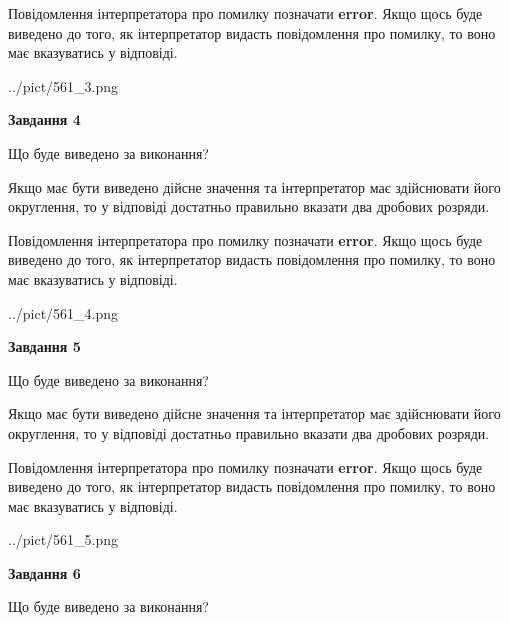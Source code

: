 \documentclass[12pt, ukrainian]{article}
\begin{document}
{\begin {Large}
Повідомлення інтерпретатора про помилку позначати \textbf{error}.
Якщо щось буде виведено до того, як інтерпретатор видасть повідомлення про помилку, 
то воно має вказуватись у відповіді. \par

\begin{center}
	{../pict/561_3.png}
\end{center}
\newpage

{\begin {center}\textbf{Завдання 4}\end {center}}\par
Що буде виведено за виконання? \par

Якщо має бути виведено дійсне значення та інтерпретатор має здійснювати його округлення, 
то у відповіді достатньо правильно вказати два дробових розряди.

Повідомлення інтерпретатора про помилку позначати \textbf{error}.
Якщо щось буде виведено до того, як інтерпретатор видасть повідомлення про помилку, 
то воно має вказуватись у відповіді. \par

\begin{center}
	{../pict/561_4.png}
\end{center}
\newpage

{\begin {center}\textbf{Завдання 5}\end {center}}\par
Що буде виведено за виконання? \par

Якщо має бути виведено дійсне значення та інтерпретатор має здійснювати його округлення, 
то у відповіді достатньо правильно вказати два дробових розряди.

Повідомлення інтерпретатора про помилку позначати \textbf{error}.
Якщо щось буде виведено до того, як інтерпретатор видасть повідомлення про помилку, 
то воно має вказуватись у відповіді. \par

\begin{center}
	{../pict/561_5.png}
\end{center}
\newpage

{\begin {center}\textbf{Завдання 6}\end {center}}\par
Що буде виведено за виконання? \par


\end{Large}}
\end{document}
